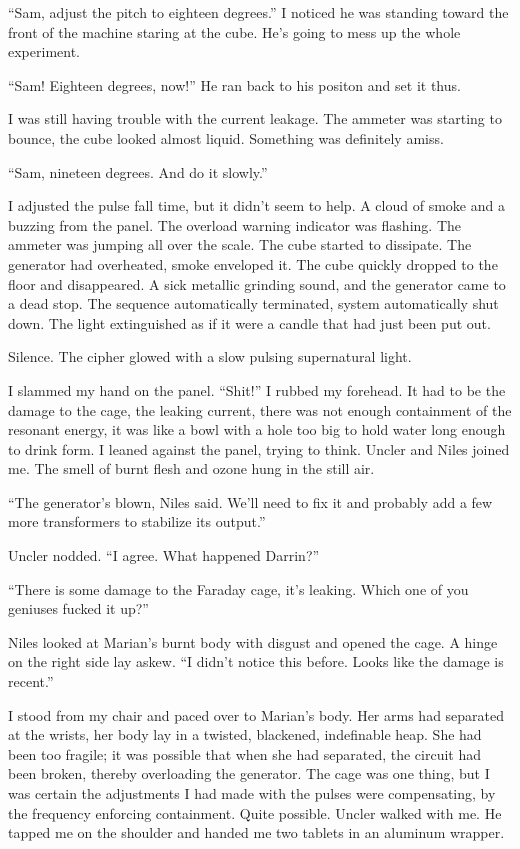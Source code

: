 ``Sam, adjust the pitch to eighteen degrees.'' I noticed he was standing
toward the front of the machine staring at the cube. He's going to mess
up the whole experiment.

``Sam! Eighteen degrees, now!'' He ran back to his positon and set it
thus.

I was still having trouble with the current leakage. The ammeter was
starting to bounce, the cube looked almost liquid. Something was
definitely amiss.

``Sam, nineteen degrees. And do it slowly.''

I adjusted the pulse fall time, but it didn't seem to help. A cloud of
smoke and a buzzing from the panel. The overload warning indicator was
flashing. The ammeter was jumping all over the scale. The cube started
to dissipate. The generator had overheated, smoke enveloped it. The cube
quickly dropped to the floor and disappeared. A sick metallic grinding
sound, and the generator came to a dead stop. The sequence automatically
terminated, system automatically shut down. The light extinguished as if
it were a candle that had just been put out.

Silence. The cipher glowed with a slow pulsing supernatural light.

I slammed my hand on the panel. ``Shit!'' I rubbed my forehead. It had
to be the damage to the cage, the leaking current, there was not enough
containment of the resonant energy, it was like a bowl with a hole too
big to hold water long enough to drink form. I leaned against the panel,
trying to think. Uncler and Niles joined me. The smell of burnt flesh
and ozone hung in the still air.

``The generator's blown, Niles said. We'll need to fix it and probably
add a few more transformers to stabilize its output.''

Uncler nodded. ``I agree. What happened Darrin?''

``There is some damage to the Faraday cage, it's leaking. Which one of
you geniuses fucked it up?''

Niles looked at Marian's burnt body with disgust and opened the cage. A
hinge on the right side lay askew. ``I didn't notice this before. Looks
like the damage is recent.''

I stood from my chair and paced over to Marian's body. Her arms had
separated at the wrists, her body lay in a twisted, blackened,
indefinable heap. She had been too fragile; it was possible that when
she had separated, the circuit had been broken, thereby overloading the
generator. The cage was one thing, but I was certain the adjustments I
had made with the pulses were compensating, by the frequency enforcing
containment. Quite possible. Uncler walked with me. He tapped me on the
shoulder and handed me two tablets in an aluminum wrapper.

